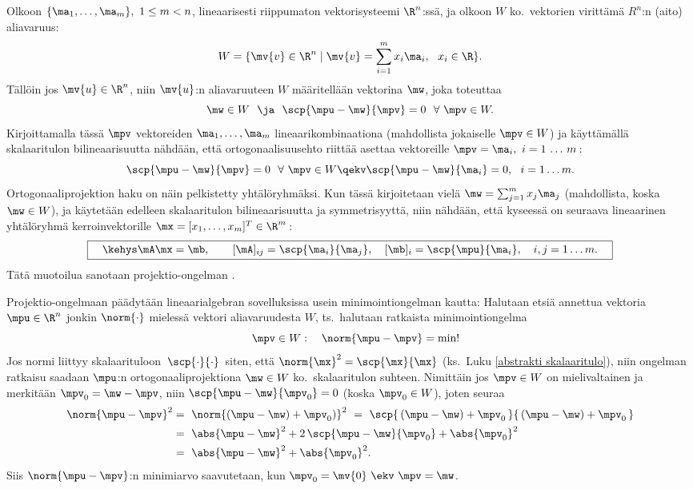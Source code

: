 Olkoon $\{\ma_1, \ldots, \ma_m\},\ 1 \le m < n$, lineaarisesti riippumaton vektorisysteemi 
$\R^n$:ssä, ja olkoon $W$ ko.\ vektorien virittämä $R^n$:n (aito) aliavaruus:
\[ 
W = \{\mv{v} \in \R^n \mid \mv{v} = \sum_{i=1}^m x_i \ma_i,\ \ x_i \in \R \}. 
\]
Tällöin jos $\mv{u} \in \R^n$, niin $\mv{u}$:n  aliavaruuteen $W$ 
määritellään vektorina $\mw$, joka toteuttaa
\[ 
\mw \in W\ \ \ja\ \ \scp{\mpu-\mw}{\mpv} = 0\ \ \forall\ \mpv \in W. 
\]
Kirjoittamalla tässä $\mpv$ vektoreiden $\ma_1, \ldots, \ma_m$ lineaarikombinaationa 
(mahdollista jokaiselle $\mpv \in W$) ja käyttämällä skalaaritulon bilineaarisuutta nähdään,
että ortogonaalisuusehto riittää asettaa vektoreille $\mpv=\ma_i,\ i= 1\,\ldots\,m\,$:
\[ 
\scp{\mpu-\mw}{\mpv} = 0\ \ \forall\ \mpv \in W  
               \qekv \scp{\mpu-\mw}{\ma_i} = 0,\ \ i = 1 \ldots m. 
\]
Ortogonaaliprojektion haku on näin pelkistetty yhtälöryhmäksi. Kun tässä kirjoitetaan vielä
$\mw = \sum_{j=1}^m x_j \ma_j$ (mahdollista, koska $\mw \in W$), ja käytetään edelleen 
skalaaritulon bilineaarisuutta ja symmetrisyyttä, niin nähdään, että kyseessä on seuraava 
lineaarinen yhtälöryhmä kerroinvektorille $\mx = [x_1, \ldots, x_m]^T\in\R^m$\,:
\[ 
\boxed{\quad\kehys \mA\mx = \mb, \qquad 
              [\mA]_{ij} = \scp{\ma_i}{\ma_j}, \quad [\mb]_i = \scp{\mpu}{\ma_i}, 
                                               \quad i,j = 1 \ldots m. \quad } 
\]
%
Tätä muotoilua sanotaan projektio-ongelman . 

Projektio-ongelmaan päädytään lineaarialgebran sovelluksissa usein minimointiongelman kautta:
Halutaan etsiä annettua vektoria $\mpu\in\R^n$ jonkin  $\norm{\cdot}$ mielessä 
 vektori aliavaruudesta $W$, ts.\ halutaan ratkaista minimointiongelma
\[ 
\quad \mpv \in W: \quad \norm{\mpu-\mpv} = \text{min!} 
\]
Jos normi liittyy skalaarituloon $\,\scp{\cdot}{\cdot}\,$ siten, että 
$\norm{\mx}^2=\scp{\mx}{\mx}$ (ks.\ Luku \ref{abstrakti skalaaritulo}), niin ongelman ratkaisu
saadaan $\mpu$:n ortogonaaliprojektiona $\mw \in W$ ko.\ skalaaritulon suhteen. Nimittäin jos
$\mpv \in W$ on mielivaltainen ja merkitään $\mpv_0 = \mw-\mpv$, niin
$\scp{\mpu-\mw}{\mpv_0}=0$ (koska $\mpv_0 \in W$), joten seuraa
\begin{align*}
\norm{\mpu-\mpv}^2 &=\ \norm{(\mpu-\mw)+\mpv_0)}^2\ 
                    =\ \scp{\,(\mpu-\mw)+\mpv_0\,}{\,(\mpu-\mw)+\mpv_0\,} \\
                   &=\ \abs{\mpu-\mw}^2 + 2\,\scp{\mpu-\mw}{\mpv_0} + \abs{\mpv_0}^2 \\
                   &=\ \abs{\mpu-\mw}^2 + \abs{\mpv_0}^2.
\end{align*}
Siis $\norm{\mpu-\mpv}$:n minimiarvo saavutetaan, kun $\mpv_0=\mv{0}\ \ekv\ \mpv = \mw$.

